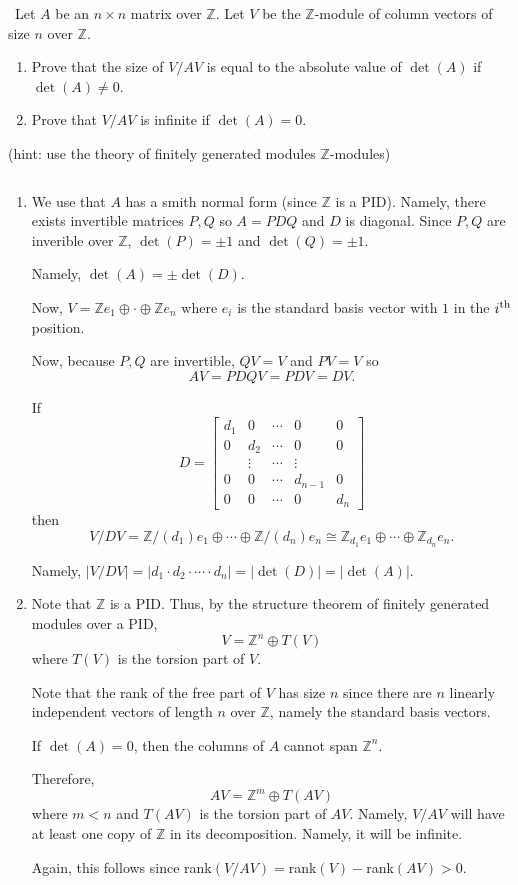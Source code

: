 \documentclass[12pt]{Qual}
\begin{document}
\begin{problem} $\,$
Let $A$ be an $n\times n$ matrix over $\mathbb{Z}$. Let $V$ be the $\mathbb{Z}$-module of column vectors of size $n$ over $\mathbb{Z}$.
\begin{enumerate}[label=(\alph*)]
    \item Prove that the size of $V/AV$ is equal to the absolute value of $\det(A)$ if $\det(A)\not=0$.
    \item Prove that $V/AV$ is infinite if $\det(A)=0$.
\end{enumerate}
(hint: use the theory of finitely generated modules $\mathbb{Z}$-modules)
\end{problem}


\begin{solution}$\,$
\begin{enumerate}[label=(\alph*)]
    \item We use that $A$ has a smith normal form (since $\mathbb{Z}$ is a PID). Namely, there exists invertible matrices $P,Q$ so $A=PDQ$ and $D$ is diagonal. Since $P,Q$ are inverible over $\mathbb{Z}$, $\det(P)=\pm1$ and $\det(Q)=\pm1$.

    Namely, $\det(A)=\pm \det(D)$.

    Now, $V=\mathbb{Z}e_1\oplus\cdot\oplus\mathbb{Z}e_n$ where $e_i$ is the standard basis vector with $1$ in the $i^\text{th}$ position.

    Now, because $P,Q$ are invertible, $QV=V$ and $PV=V$ so $$AV=PDQV=PDV=DV.$$

    If $$D=\begin{bmatrix}
    d_1 & 0 & \cdots & 0 & 0\\
    0 & d_2 & \cdots & 0 & 0\\
    & \vdots & \cdots & \vdots &\\
    0 & 0 &\cdots & d_{n-1} & 0\\
    0 & 0 & \cdots & 0 & d_n
    \end{bmatrix}$$ then $$V/DV=\mathbb{Z}/(d_1)e_1\oplus\cdots\oplus \mathbb{Z}/(d_n)e_n\cong\mathbb{Z}_{d_1}e_1\oplus\cdots\oplus\mathbb{Z}_{d_n}e_n.$$

    Namely, $|V/DV|=|d_1\cdot d_2\cdot\cdots\cdot d_n|=|\det(D)|=|\det(A)|.$

    \item  Note that $\mathbb{Z}$ is a PID. Thus, by the structure theorem of finitely generated modules over a PID, $$V=\mathbb{Z}^n\oplus T(V)$$ where $T(V)$ is the torsion part of $V.$

    Note that the rank of the free part of $V$ has size $n$ since there are $n$ linearly independent vectors of length $n$ over $\mathbb{Z}$, namely the standard basis vectors.

    If $\det(A)=0$, then the columns of $A$ cannot span $\mathbb{Z}^n$.

    Therefore, $$AV=\mathbb{Z}^m\oplus T(AV)$$ where $m<n$ and $T(AV)$ is the torsion part of $AV.$ Namely, $V/AV$ will have at least one copy of $\mathbb{Z}$ in its decomposition. Namely, it will be infinite.

    Again, this follows since rank$(V/AV)=$rank$(V)-$rank$(AV)>0$.
\end{enumerate}
\end{solution}
\end{document}
